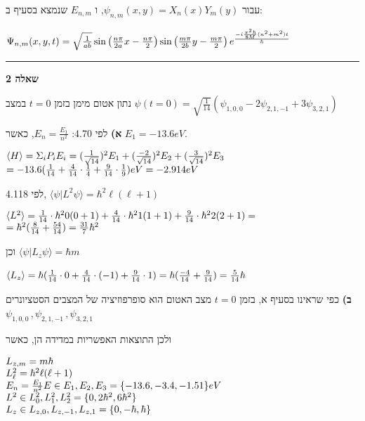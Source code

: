 \documentclass[14pt]{extarticle}
\makeatletter
\newenvironment{lefteqs}{%
    \begin{english}%
    \begin{flushleft}%
    \renewcommand{\arraystretch}{1.3}%
    $\begin{array}{@{}l@{}}%
}{%
    \end{array}$%
    \end{flushleft}%
    \end{english}%
}
\makeatother
\begin{document}
עבור $\psi_{n,m}(x,y) = X_n(x) Y_m(y)$, ו $E_{n,m}$ שנמצא בסעיף ב:

\begin{lefteqs}
    \Psi_{n,m}(x,y,t) = \sqrt{\frac{1}{ab}} \sin\left(\frac{n\pi}{2a}x - \frac{n\pi}{2}\right) \sin\left(\frac{m\pi}{2b}y - \frac{m\pi}{2}\right) e^{\frac{-i \frac{\pi^2 \hbar}{8M} (n^2 + m^2) t}{\hbar}}
\end{lefteqs}

\vspace{3em}
\hrule
\vspace{2em}

\textbf{\large שאלה 2}

נתון אטום מימן בזמן $t=0$ במצב $\psi(t=0) = \sqrt{\frac{1}{14}} (\psi_{1,0,0} - 2\psi_{2,1,-1} + 3\psi_{3,2,1})$

\textbf{א)}
לפי 4.70: $E_n = \frac{E_1}{n^2}$, כאשר $E_1 = -13.6 eV$.

\begin{lefteqs}
    \langle H \rangle = \Sigma_i P_i E_i = (\frac{1}{\sqrt{14}})^2 E_1 + (\frac{-2}{\sqrt{14}})^2 E_2 + (\frac{3}{\sqrt{14}})^2 E_3 \\
    = -13.6 (\frac{1}{14} + \frac{4}{14} \cdot \frac{1}{4} + \frac{9}{14} \cdot \frac{1}{9}) eV = -2.914 eV
\end{lefteqs}

לפי 4.118,  $\langle \psi | L^2 \psi \rangle = \hbar^2 \ell (\ell + 1)$

\begin{lefteqs}
    \langle L^2 \rangle = \frac{1}{14} \cdot \hbar^2 0(0+1) + \frac{4}{14} \cdot \hbar^2 1(1+1) + \frac{9}{14} \cdot \hbar^2 2(2+1) = \\
    = \hbar^2 (\frac{8}{14} + \frac{54}{14}) = \frac{31}{7} \hbar^2
\end{lefteqs}

וכן $\langle \psi | L_z \psi \rangle = \hbar m$

\begin{lefteqs}
    \langle L_z \rangle = \hbar (\frac{1}{14} \cdot 0 + \frac{4}{14} \cdot (-1) + \frac{9}{14} \cdot 1) = \hbar (\frac{-4}{14} + \frac{9}{14}) = \frac{5}{14} \hbar
\end{lefteqs}

\textbf{ב)}
כפי שראינו בסעיף א, בזמן $t=0$ מצב האטום הוא סופרפוזיציה של המצבים הסטציונרים $\psi_{1,0,0}\, , \psi_{2,1,-1} \, , \psi_{3,2,1}$

ולכן התוצאות האפשריות במדידה הן, כאשר
\begin{lefteqs}
    L_{z,m} = m\hbar \\
    L_{\ell}^2 = \hbar^2 \ell (\ell + 1) \\
    E_n = \frac{E_1}{n^2}
    E \in {E_1, E_2, E_3} = \{-13.6, -3.4, -1.51\} eV \\
    L^2 \in {L_0^2, L_1^2, L_2^2} = \{0, 2\hbar^2, 6\hbar^2\} \\
    L_z \in {L_{z,0}, L_{z,-1}, L_{z,1}} = \{0, -\hbar, \hbar\}
\end{lefteqs}
\end{document}
